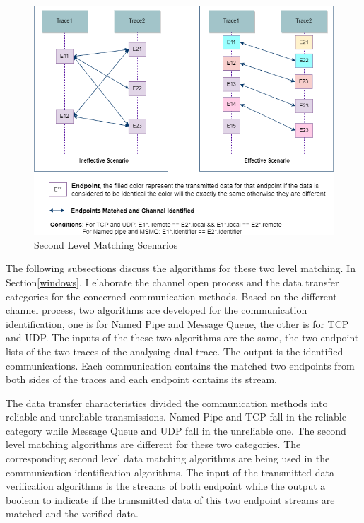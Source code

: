 \begin{figure}[H]
\centerline{\includegraphics[scale=0.55]{Figures/secondlevelmatching}}
 \caption{Second Level Matching Scenarios}
\label{secondlevelmatching}
\end{figure}


The following subsections discuss the algorithms for these two level matching. In Section\ref{windows}, I elaborate the channel open process and the data transfer categories for the concerned communication methods. Based on the different channel process, two algorithms are developed for the communication identification, one is for Named Pipe and Message Queue, the other is for TCP and UDP. The inputs of the these two algorithms are the same, the two endpoint lists of the two traces of the analysing dual-trace. The output is the identified communications. Each communication contains the matched two endpoints from both sides of the traces and each endpoint contains its stream.

The data transfer characteristics divided the communication methods into reliable and unreliable transmissions. Named Pipe and TCP fall in the reliable category while Message Queue and UDP fall in the unreliable one. The second level matching algorithms are different for these two categories. The corresponding second level data matching algorithms are being used in the communication identification algorithms. The input of the transmitted data verification algorithms is the streams of both endpoint while the output a boolean to indicate if the transmitted data of this two endpoint streams are matched and the verified data.

